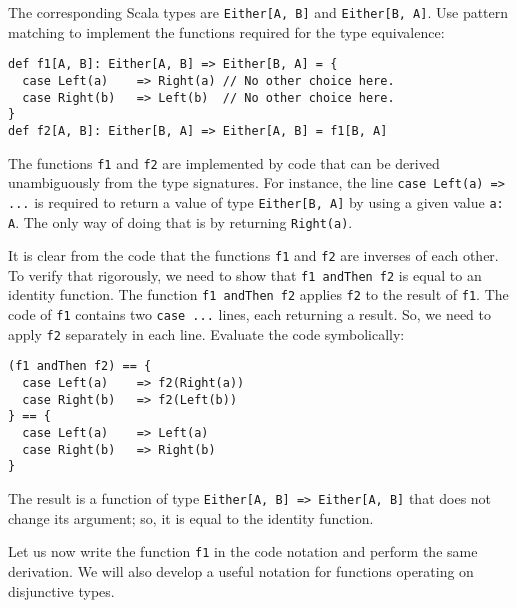 The corresponding Scala types are \lstinline!Either[A, B]! and \lstinline!Either[B, A]!.
Use pattern matching to implement the functions required for the type
equivalence:
\begin{lstlisting}
def f1[A, B]: Either[A, B] => Either[B, A] = {
  case Left(a)    => Right(a) // No other choice here.
  case Right(b)   => Left(b)  // No other choice here.
}
def f2[A, B]: Either[B, A] => Either[A, B] = f1[B, A]
\end{lstlisting}
The functions \lstinline!f1! and \lstinline!f2! are implemented
by code that can be derived unambiguously from the type signatures.
For instance, the line \lstinline!case Left(a) => ...! is required
to return a value of type \lstinline!Either[B, A]! by using a given
value \lstinline!a: A!. The only way of doing that is by returning
\lstinline!Right(a)!.

It is clear from the code that the functions \lstinline!f1! and \lstinline!f2!
are inverses of each other. To verify that rigorously, we need to
show that \lstinline!f1 andThen f2! is equal to an identity function.
The function \lstinline!f1 andThen f2! applies \lstinline!f2! to
the result of \lstinline!f1!. The code of \lstinline!f1! contains
two \lstinline!case ...! lines, each returning a result. So, we need
to apply \lstinline!f2! separately in each line. Evaluate the code
symbolically:
\begin{lstlisting}
(f1 andThen f2) == {
  case Left(a)    => f2(Right(a))
  case Right(b)   => f2(Left(b))
} == {
  case Left(a)    => Left(a)
  case Right(b)   => Right(b)
}
\end{lstlisting}
The result is a function of type \lstinline!Either[A, B] => Either[A, B]!
that does not change its argument; so, it is equal to the identity
function. 

Let us now write the function \lstinline!f1! in the code notation
and perform the same derivation. We will also develop a useful notation
for functions operating on disjunctive types.

